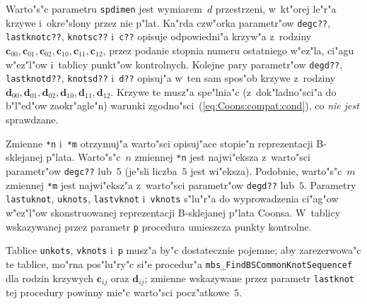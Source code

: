 Warto"s"c parametru \texttt{spdimen} jest wymiarem~$d$ przestrzeni, w~kt"orej
le"r"a krzywe i~okre"slony przez nie p"lat. Ka"rda czw"orka parametr"ow
\texttt{degc??}, \texttt{lastknotc??}, \texttt{knotsc??} i~\texttt{c??}
opisuje odpowiedni"a krzyw"a z~rodziny
$\bm{c}_{00},\bm{c}_{01},\bm{c}_{02},\bm{c}_{10},\bm{c}_{11},\bm{c}_{12}$,
przez podanie stopnia
numeru ostatniego w"ez"la, ci"agu w"ez"l"ow i~tablicy punkt"ow kontrolnych.
Kolejne pary parametr"ow \texttt{degd??}, \texttt{lastknotd??},
\texttt{knotsd??} i~\texttt{d??} opisuj"a w~ten sam spos"ob krzywe z~rodziny
$\bm{d}_{00},\bm{d}_{01},\bm{d}_{02},\bm{d}_{10},\bm{d}_{11},\bm{d}_{12}$.
Krzywe te musz"a spe"lnia"c (z~dok"ladno"sci"a do b"l"ed"ow zaokr"agle"n) warunki
zgodno"sci~(\ref{eq:Coons:compat:cond}), co \emph{nie jest} sprawdzane.

Zmienne \texttt{*n} i~\texttt{*m} otrzymuj"a warto"sci opisuj"ace stopie"n
reprezentacji B-sklejanej p"lata. Warto"s"c~$n$ zmiennej \texttt{*n} jest
najwi"eksza z~warto"sci parametr"ow \texttt{degc??} lub~$5$ (je"sli
liczba~$5$ jest wi"eksza). Podobnie, warto"s"c~$m$ zmiennej \texttt{*m}
jest najwi"eksz"a z~warto"sci parametr"ow \texttt{degd??} lub~$5$. Parametry
\texttt{lastuknot}, \texttt{uknots}, \texttt{lastvknot} i~\texttt{vknots}
s"lu"r"a do wyprowadzenia ci"ag"ow w"ez"l"ow skonstruowanej reprezentacji
B-sklejanej p"lata Coonsa. W~tablicy wskazywanej przez
parametr \texttt{p} procedura umieszcza punkty kontrolne.

Tablice \texttt{unkots}, \texttt{vknots} i~\texttt{p} musz"a by"c
dostatecznie pojemne; aby zarezerwowa"c te tablice, mo"rna pos"lu"ry"c si"e
procedur"a \texttt{mbs\_FindBSCommonKnotSequencef} dla rodzin krzywych
$\bm{c}_{ij}$ oraz $\bm{d}_{ij}$; zmienne wskazywane przez parametr
\texttt{lastknot} tej procedury powinny mie"c warto"sci pocz"atkowe~$5$.


